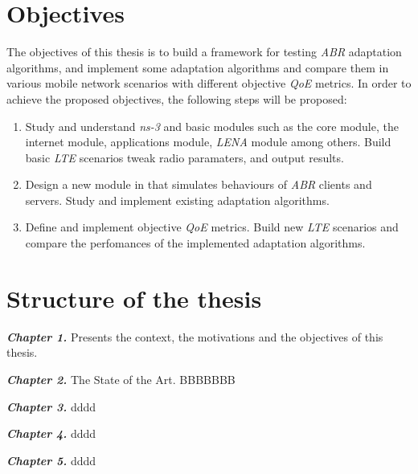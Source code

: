 \section{Objectives}
\label{sec:objectives}
The objectives of this thesis is to build a framework for testing \textit{ABR} adaptation
algorithms, and implement some adaptation algorithms and compare them in 
various mobile network scenarios with different objective \textit{QoE} metrics. 
In order to achieve the proposed objectives, the following steps will be proposed:

\begin{enumerate}
  \item Study and understand \textit{ns-3} and basic modules such as the core module, the
  internet module, applications module, \textit{LENA} module among others. Build basic \textit{LTE} scenarios
  tweak radio paramaters, and output results.
  \item Design a new module in  that simulates behaviours of \textit{ABR} clients
  and servers. Study and implement existing adaptation algorithms.
  \item Define and implement objective \textit{QoE} metrics.
  Build new \textit{LTE} scenarios and compare the perfomances of the implemented adaptation
  algorithms.
\end{enumerate}


\section{Structure of the thesis}
\label{sec:structure}


\textbf{\textit{Chapter 1.}} Presents the context, the motivations and the objectives of this thesis.

\textbf{\textit{Chapter 2.}} The State of the Art. BBBBBBB

\textbf{\textit{Chapter 3.}} dddd

\textbf{\textit{Chapter 4.}} dddd

\textbf{\textit{Chapter 5.}} dddd
